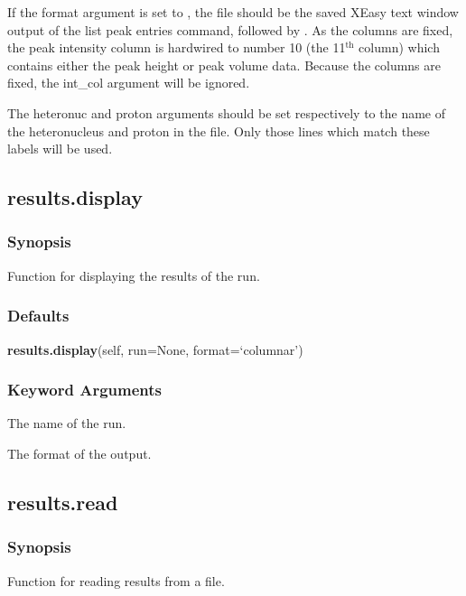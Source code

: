 If the format argument is set to 
, the file should be the saved XEasy text window
output of the list peak entries command, 
 followed by 
.  As the columns are fixed,
the peak intensity column is hardwired to number 10 (the 11$^\mathrm{th}$ column) which contains either
the peak height or peak volume data.  Because the columns are fixed, the int\_col argument
will be ignored.


The heteronuc and proton arguments should be set respectively to the name of the
heteronucleus and proton in the file.  Only those lines which match these labels will be
used.


\newpage

\subsection{results.display}


\subsubsection{Synopsis}

Function for displaying the results of the run.

\subsubsection{Defaults}

\textsf{\textbf{results.display}(self, run=None, format=`columnar')}


\subsubsection{Keyword Arguments}


  The name of the run.

  The format of the output.


\newpage

\subsection{results.read}


\subsubsection{Synopsis}

Function for reading results from a file.

